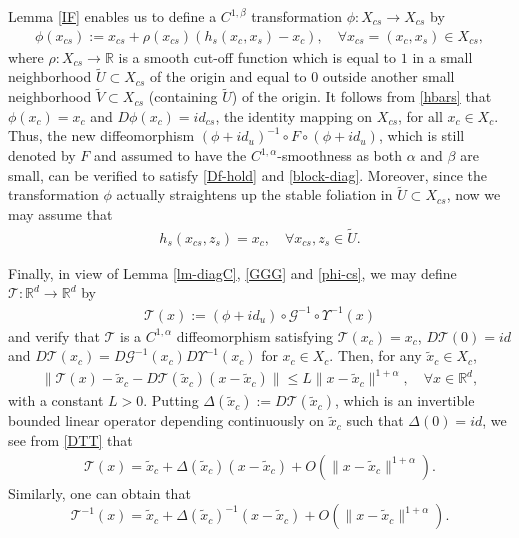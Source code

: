 \documentclass[reqno]{amsart}
\numberwithin{equation}{section}
\begin{document}
Lemma \ref{IF} enables us to define a $C^{1,\beta}$ transformation $\phi:X_{cs}\to X_{cs}$ by
\begin{align}\label{phi-cs}
\phi(x_{cs}):=x_{cs}+\rho(x_{cs})(h_s(x_c,x_s)-x_c),\quad \forall x_{cs}=(x_c,x_s)\in X_{cs},
\end{align}
where $\rho:X_{cs}\to \mathbb{R}$ is a smooth cut-off function which is equal to $1$ in a small neighborhood $\tilde U\subset X_{cs}$ of the origin and equal to $0$ outside another small neighborhood $\tilde V\subset X_{cs}$ (containing $\tilde U$) of the origin. It follows from \eqref{hbars} that $\phi(x_c)=x_c$ and $D\phi(x_c)=id_{cs}$, the identity mapping on $X_{cs}$,  for all $x_c\in X_c$. Thus, the new diffeomorphism $(\phi+id_u)^{-1}\circ F \circ (\phi+id_u)$, which is still denoted by $F$ and assumed to have the $C^{1,\alpha}$-smoothness as both $\alpha$ and $\beta$ are small, can be verified to satisfy \eqref{Df-hold} and \eqref{block-diag}. Moreover, since the transformation $\phi$ actually straightens up the stable foliation in $\tilde U\subset X_{cs}$, now we may assume that
\begin{align}\label{Wcs-Stp}
h_s(x_{cs},z_s)=x_c,\quad \forall x_{cs},z_s\in \tilde U.
\end{align}
 
 
 
Finally,  in view of Lemma \ref{lm-diagC},
\eqref{GGG} and \eqref{phi-cs}, we may define $\mathcal{T}:\mathbb{R}^d\to \mathbb{R}^d$ by
\begin{align}\label{TTT}
 \mathcal{T}(x):=  (\phi+id_u)\circ\mathcal{G}^{-1}\circ \Upsilon^{-1} (x)  %
\end{align}
and verify that $\mathcal{T}$ is a $C^{1,\alpha}$ diffeomorphism satisfying $\mathcal{T}(x_c)=x_c$, $D\mathcal{T}(0)=id$ and 
$D\mathcal{T}(x_c)=D\mathcal{G}^{-1}(x_c) D\Upsilon^{-1}(x_c)$
for  $x_c\in X_c$. Then,
for any $\tilde{x}_c\in X_c$,
\begin{align}\label{DTT}
\|\mathcal{T}(x)-\tilde{x}_c-D\mathcal{T}(\tilde{x}_c)(x-\tilde{x}_c)\|\le L\|x-\tilde{x}_c\|^{1+\alpha}, \quad \forall x\in \mathbb{R}^d,
\end{align}
with a constant $L>0$.
Putting 
$\Delta(\tilde{x}_c):=D\mathcal{T}(\tilde{x}_c)$,
which is an invertible bounded linear operator depending continuously on $\tilde{x}_c$ such that $\Delta(0)=id$, we see from \eqref{DTT} that
\begin{align}\label{T-Re}
\mathcal{T}(x)=\tilde x_c+\Delta(\tilde{x}_c)(x-\tilde{x}_c)+O(\|x-\tilde{x}_c\|^{1+\alpha}).
\end{align}
Similarly, one can obtain that
$$
\mathcal{T}^{-1}(x)=\tilde{x}_c+\Delta(\tilde{x}_c)^{-1}(x-\tilde{x}_c)+O(\|x-\tilde{x}_c\|^{1+\alpha}).
$$
\end{document}

